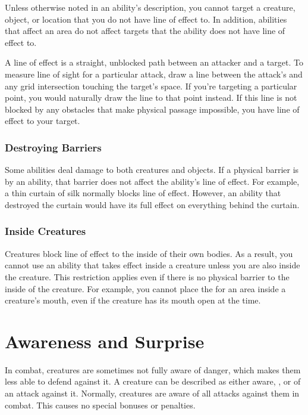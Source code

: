     Unless otherwise noted in an ability's description, you cannot target a creature, object, or location that you do not have line of effect to.
    In addition, abilities that affect an area do not affect targets that the ability does not have line of effect to.

    A line of effect is a straight, unblocked path between an attacker and a target.
    To measure line of sight for a particular attack, draw a line between the attack's  and any grid intersection touching the target's space.
    If you're targeting a particular point, you would naturally draw the line to that point instead.
    If this line is not blocked by any obstacles that make physical passage impossible, you have line of effect to your target.

    \subsubsection{Destroying Barriers}\label{Destroying Barriers}
      Some abilities deal damage to both creatures and objects.
      If a physical barrier is  by an ability, that barrier does not affect the ability's line of effect.
      For example, a thin curtain of silk normally blocks line of effect.
      However, an ability that destroyed the curtain would have its full effect on everything behind the curtain.

    \subsubsection{Inside Creatures}
      Creatures block line of effect to the inside of their own bodies.
      As a result, you cannot use an ability that takes effect inside a creature unless you are also inside the creature.
      This restriction applies even if there is no physical barrier to the inside of the creature.
      For example, you cannot place the  for an area inside a creature's mouth, even if the creature has its mouth open at the time.

\section{Awareness and Surprise}\label{Awareness and Surprise}
  In combat, creatures are sometimes not fully aware of danger, which makes them less able to defend against it.
  A creature can be described as either aware, \unaware, or \partiallyunaware of an attack against it.
  Normally, creatures are aware of all attacks against them in combat.
  This causes no special bonuses or penalties.

